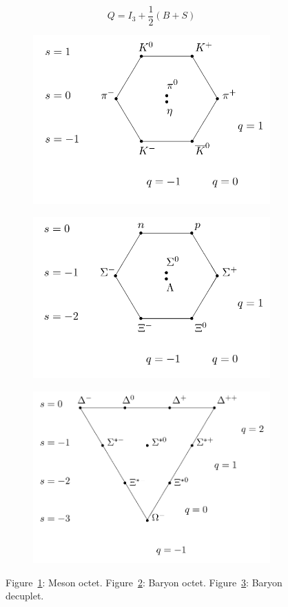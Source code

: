 	\begin{equation}
		\label{eq:NNG}
		Q = I_3 + \frac{1}{2}(B+S)
	\end{equation}
	
	\begin{figure}[H]
		\begin{subfigure}{\linewidth}
			\centering
			\includegraphics[width=0.4\linewidth]{fig/chapt2/Meson_octet.png}\\
			\caption{\label{fig:Eightfold:A}}
		\end{subfigure}
		\begin{subfigure}{0.5\linewidth}
			\centering
			\includegraphics[width=0.8\linewidth]{fig/chapt2/Baryon_octet.png}
			\caption{\label{fig:Eightfold:B}}
		\end{subfigure}
		\begin{subfigure}{0.5\linewidth}
			\centering
			\includegraphics[width=0.8\linewidth]{fig/chapt2/Baryon_decuplet.png}
			\caption{\label{fig:Eightfold:C}}
		\end{subfigure}
		\caption{\label{fig:Eightfold} Figure~\ref{fig:Eightfold:A}: Meson octet. Figure~\ref{fig:Eightfold:B}: Baryon octet. Figure~\ref{fig:Eightfold:C}: Baryon decuplet.}
	\end{figure}
	
